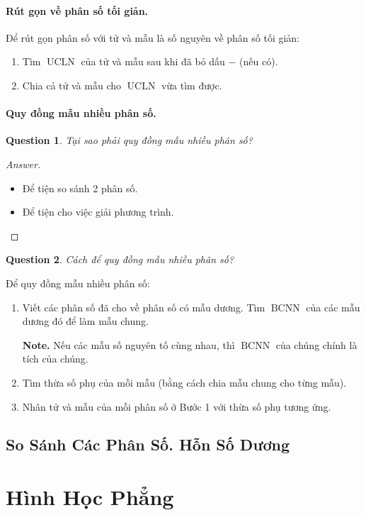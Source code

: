 \documentclass{article}
\numberwithin{equation}{section}
\newtheorem{ques}{Question}[section]
\begin{document}
\paragraph{Rút gọn về phân số tối giản.}
Để rút gọn phân số với tử và mẫu là số nguyên về phân số tối giản:
\begin{enumerate}
	\item Tìm $\operatorname{UCLN}$ của tử và mẫu sau khi đã bỏ dấu $-$ (nếu có).
	\item Chia cả tử và mẫu cho $\operatorname{UCLN}$ vừa tìm được.
\end{enumerate}

\paragraph{Quy đồng mẫu nhiều phân số.}
\begin{ques}
	Tại sao phải quy đồng mẫu nhiều phân số?
\end{ques}

\begin{proof}[Answer]
	\begin{itemize}
		\item Để tiện so sánh 2 phân số.
		\item Để tiện cho việc giải phương trình.
	\end{itemize}
\end{proof}

\begin{ques}
	Cách để quy đồng mẫu nhiều phân số?
\end{ques}
Để quy đồng mẫu nhiều phân số:
\begin{enumerate}
	\item Viết các phân số đã cho về phân số có mẫu dương. Tìm $\operatorname{BCNN}$ của các mẫu dương đó để làm mẫu chung.
	
	\textbf{Note.} Nếu các mẫu số nguyên tố cùng nhau, thì $\operatorname{BCNN}$ của chúng chính là tích của chúng.
	\item Tìm thừa số phụ của mỗi mẫu (bằng cách chia mẫu chung cho từng mẫu).
	\item Nhân tử và mẫu của mỗi phân số ở Bước 1 với thừa số phụ tương ứng.
\end{enumerate}

\subsection{So Sánh Các Phân Số. Hỗn Số Dương}

\section{Hình Học Phẳng}
\end{document}
